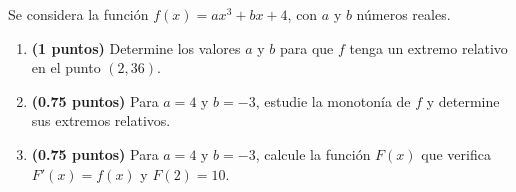 
Se considera la función $f(x)=ax^3+bx+4$, con $a$ y $b$ números reales.
\begin{enumerate}[label=\alph*)]
  \item \textbf{(1 puntos)} Determine los valores $a$ y $b$ para que $f$
  tenga un extremo relativo en el punto $(2,36)$.
  \item \textbf{(0.75 puntos)} Para $a=4$ y $b=-3$, estudie la monotonía de
  $f$ y determine sus extremos relativos.
  \item \textbf{(0.75 puntos)} Para $a=4$ y $b=-3$, calcule la función $F(x)$
  que verifica $F'(x)=f(x)$ y $F(2)=10$.
\end{enumerate}

